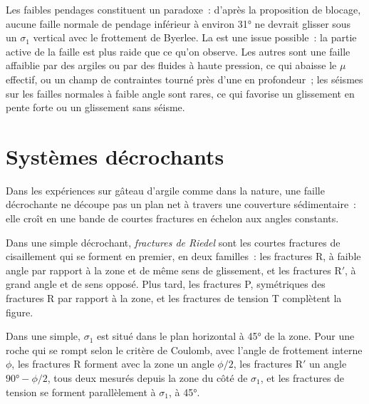 Les faibles pendages constituent un paradoxe~: d'après la proposition de blocage, aucune faille
normale de pendage inférieur à environ \ang{31} ne devrait glisser sous un $\sigma_1$ vertical
avec le frottement de Byerlee. La  est une issue possible~: la partie active de la
faille est plus raide que ce qu'on observe. Les autres sont une faille affaiblie par des argiles
ou par des fluides à haute pression, ce qui abaisse le $\mu$ effectif, ou un champ de contraintes
tourné près d'une  en profondeur~; les séismes sur les failles normales à faible
angle sont rares, ce qui favorise un glissement en pente forte ou un glissement sans séisme.

\section{Systèmes décrochants}\label{sec:b3:extension-strike-slip:strike-slip}

Dans les expériences sur gâteau d'argile comme dans la nature, une faille décrochante ne découpe pas
un plan net à travers une couverture sédimentaire~: elle croît en une bande de courtes
fractures en échelon aux angles constants.

\begin{definition}\label{def:b3:extension-strike-slip:riedel}
Dans une  simple décrochant, \emph{fractures de Riedel}
sont les courtes fractures de cisaillement qui se forment en premier, en deux familles~: les fractures R,
à faible angle par rapport à la zone et de même sens de glissement, et les fractures R$'$,
à grand angle et de sens opposé. Plus tard, les fractures P, symétriques
des fractures R par rapport à la zone, et les fractures de tension T complètent la figure.
\end{definition}

\begin{proposition}\label{prop:b3:extension-strike-slip:riedel}
Dans une  simple, $\sigma_1$ est situé dans le plan horizontal à
\ang{45} de la zone. Pour une roche qui se rompt selon le critère de Coulomb, avec l'angle
de frottement interne $\phi$, les fractures R forment avec la zone un angle $\phi/2$, les
fractures R$'$ un angle $\ang{90} - \phi/2$, tous deux mesurés depuis la zone
du côté de $\sigma_1$, et les fractures de tension se forment parallèlement à $\sigma_1$,
à \ang{45}.
\end{proposition}


